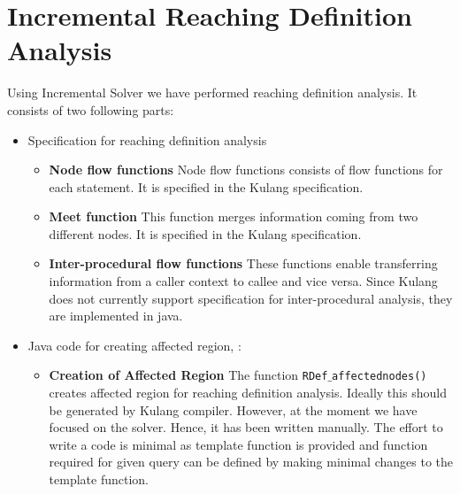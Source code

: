 \documentclass[11pt,a4paper,openright]{report}
\begin{document}
\section{Incremental Reaching Definition Analysis}
Using Incremental Solver we have performed reaching definition analysis. It consists of two following parts:
\begin{itemize}
\item Specification for reaching definition analysis
  \begin{itemize}
  \item \textbf{Node flow functions} Node flow functions consists of flow functions for 
 each statement.  It is specified in the Kulang specification. 
  \item \textbf{Meet function} This function merges information coming from two different nodes. It is specified in the Kulang specification.
  \item \textbf{Inter-procedural flow functions} These functions enable transferring information from a caller context to callee and vice versa.
 Since Kulang does not currently support specification for inter-procedural analysis, they are implemented in java.
\end{itemize}
\item Java code for creating affected region, :
\begin{itemize}
 \item \textbf{Creation of Affected Region} The function \texttt{RDef$\_$affectednodes()} creates affected region for reaching definition
 analysis. Ideally this should be generated by Kulang compiler. However, at the moment we have focused on the solver.
 Hence, it has been written manually. The effort to write a code is minimal as template function is provided and function required for given query 
 can be defined by making minimal changes to the template function.
 \end{itemize}
\end{itemize}


\end{document}
